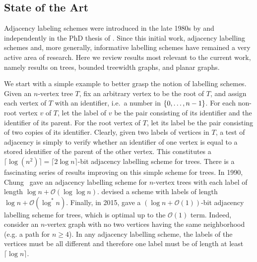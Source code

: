 \documentclass{patmorin}
\renewcommand{\geq}{\geqslant}
\newcommand{\vida}[1]{\noindent{\color{pink} VD: #1}}
\newcommand{\pat}[1]{\noindent\textcolor{Magenta}{PaMo: #1}}
\newcommand{\Oh}{\calO}
\DeclarePairedDelimiter{\set}{\{}{\}}
\newcommand{\calO}{\mathcal{O}}
\begin{document}
\subsection{State of the Art}
\label{ssec:state-of-art}

Adjacency labeling schemes were introduced in the late 1980s
by \citet{kannan.naor.ea:implicit} and independently in the PhD thesis of \citet{muller:local}. Since this initial work, adjacency labelling schemes and, more generally, informative labelling schemes have remained a very active area of research.
Here we review results most relevant to the current work, namely results on trees, bounded treewidth graphs, and planar
graphs.

We start with a simple example to better grasp the notion of labelling schemes.
Given an $n$-vertex tree $T$, fix an arbitrary vertex to be the root of $T$, and assign each vertex of $T$ with an identifier, i.e.\ a number in $\set{0,\ldots,n-1}$.
For each non-root vertex $v$ of $T$,
let the label of $v$ be
the pair consisting of its identifier and the identifier of its parent.
For the root vertex of $T$, let its label be
the pair consisting of two copies of its identifier.
Clearly, given two labels of vertices in $T$,
a test of adjacency is simply to verify whether an identifier of one vertex is equal to a stored identifier of the parent of the other vertex.
This constitutes a $\lceil\log(n^2)\rceil=\lceil2\log n\rceil$-bit adjacency labelling scheme for trees.
There is a fascinating series of results improving on this simple scheme for trees. In 1990, Chung~\cite{chung:universal} gave an adjacency labelling scheme for $n$-vertex trees with each label of length $\log n +\Oh(\log\log n)$.
\citet{alstrup.rauhe:improved} devised a scheme with labels of length $\log n+\Oh(\log^*n)$.
Finally, in 2015,
\citet{alstrup.dahlgaard.ea:optimal} gave a $(\log n + \Oh(1))$-bit adjacency labelling scheme for trees, which is optimal up to the $\Oh(1)$ term.
Indeed, consider an $n$-vertex graph with no two vertices having the same neighborhood (e.g. a path for $n\geq4$).
In any adjacency labelling scheme,
the labels of the vertices must be all different and therefore one label must be of length at least $\lceil\log n\rceil$.
\end{document}
